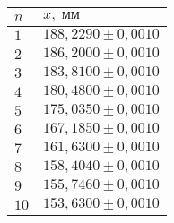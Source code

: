 \begin{tabular}{|l|l|}
\hline
$n$ & $x,\;\text{мм}$\\\hline
$1$ & $188{,}2290 \pm 0{,}0010$\\\hline
$2$ & $186{,}2000 \pm 0{,}0010$\\\hline
$3$ & $183{,}8100 \pm 0{,}0010$\\\hline
$4$ & $180{,}4800 \pm 0{,}0010$\\\hline
$5$ & $175{,}0350 \pm 0{,}0010$\\\hline
$6$ & $167{,}1850 \pm 0{,}0010$\\\hline
$7$ & $161{,}6300 \pm 0{,}0010$\\\hline
$8$ & $158{,}4040 \pm 0{,}0010$\\\hline
$9$ & $155{,}7460 \pm 0{,}0010$\\\hline
$10$ & $153{,}6300 \pm 0{,}0010$\\\hline
\end{tabular}
